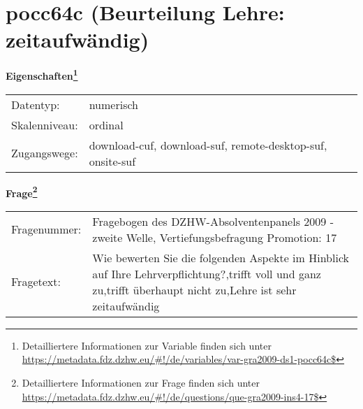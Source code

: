 
    \setcounter{footnote}{0}

    \vspace*{-1.8cm}
	\section{pocc64c (Beurteilung Lehre: zeitaufwändig)}
	\label{section:pocc64c}



    \vspace*{0.5cm}
    \noindent\textbf{Eigenschaften\footnote{Detailliertere Informationen zur Variable finden sich unter
		\url{https://metadata.fdz.dzhw.eu/\#!/de/variables/var-gra2009-ds1-pocc64c$}}}\\
	\begin{tabularx}{\hsize}{@{}lX}
	Datentyp: & numerisch \\
	Skalenniveau: & ordinal \\
	Zugangswege: &
	  download-cuf, 
	  download-suf, 
	  remote-desktop-suf, 
	  onsite-suf
 \\
    \end{tabularx}



				\vspace*{0.5cm}
                \noindent\textbf{Frage\footnote{Detailliertere Informationen zur Frage finden sich unter
		              \url{https://metadata.fdz.dzhw.eu/\#!/de/questions/que-gra2009-ins4-17$}}}\\
				\begin{tabularx}{\hsize}{@{}lX}
					Fragenummer: &
					  Fragebogen des DZHW-Absolventenpanels 2009 - zweite Welle, Vertiefungsbefragung Promotion:
					  17
 \\
					Fragetext: & Wie bewerten Sie die folgenden Aspekte im Hinblick auf Ihre Lehrverpflichtung?,trifft voll und ganz zu,trifft überhaupt nicht zu,Lehre ist sehr zeitaufwändig \\
				\end{tabularx}





